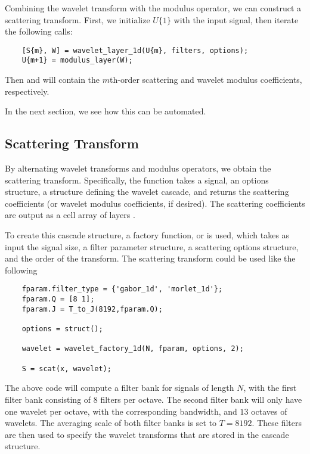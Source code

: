 \documentclass[twocolumn]{article}
\begin{document}
Combining the wavelet transform with the modulus operator, we can construct a scattering transform. First, we initialize $U\{1\}$ with the input signal, then 
iterate the following calls:
\begin{lstlisting}
	[S{m}, W] = wavelet_layer_1d(U{m}, filters, options);
	U{m+1} = modulus_layer(W);
\end{lstlisting}
Then  and  will contain the $m$th-order scattering and wavelet modulus coefficients, respectively.

In the next section, we see how this can be automated.

\subsection{Scattering Transform}

By alternating wavelet transforms and modulus operators, we obtain the scattering transform. Specifically, the  function takes a signal, an options 
structure, a structure defining the wavelet cascade, and returns the scattering coefficients (or wavelet modulus coefficients, if desired). The scattering 
coefficients are output as a cell array of layers .

To create this cascade structure, a factory function,  or  is used, which takes as input the signal size, a
 filter parameter structure, a scattering options structure, and the order of the transform. The scattering transform could be used like the following

\begin{lstlisting}
	fparam.filter_type = {'gabor_1d', 'morlet_1d'};
	fparam.Q = [8 1];
	fparam.J = T_to_J(8192,fparam.Q);
	
	options = struct();
	
	wavelet = wavelet_factory_1d(N, fparam, options, 2);
	
	S = scat(x, wavelet);
\end{lstlisting}

The above code will compute a filter bank for signals of length $N$, with the first filter bank consisting of $8$ filters per octave. The second filter bank 
will only have one wavelet per octave, with the corresponding bandwidth, and $13$ octaves of wavelets. The averaging scale of both filter banks is set to $T = 8192$.
These filters are then used to specify the wavelet transforms that are stored in the cascade structure.
\end{document}
